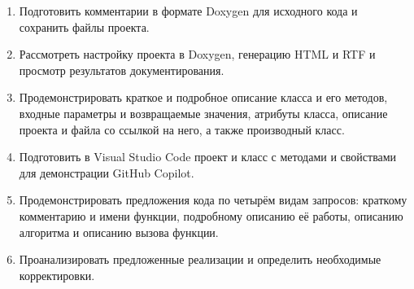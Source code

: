 \begin{enumerate}
	\item Подготовить комментарии в формате Doxygen для исходного кода
	и сохранить файлы проекта.
	\item Рассмотреть настройку проекта в Doxygen, генерацию HTML и RTF
	и просмотр результатов документирования.
	\item Продемонстрировать краткое и подробное описание класса и его методов,
	входные параметры и возвращаемые значения, атрибуты класса, описание
	проекта и файла со ссылкой на него, а также производный класс.
	\item Подготовить в Visual Studio Code проект и класс с методами и свойствами
	для демонстрации GitHub Copilot.
	\item Продемонстрировать предложения кода по четырём видам запросов:
	краткому комментарию и имени функции, подробному описанию её работы,
	описанию алгоритма и описанию вызова функции.
	\item Проанализировать предложенные реализации и определить необходимые
	корректировки.
\end{enumerate}
